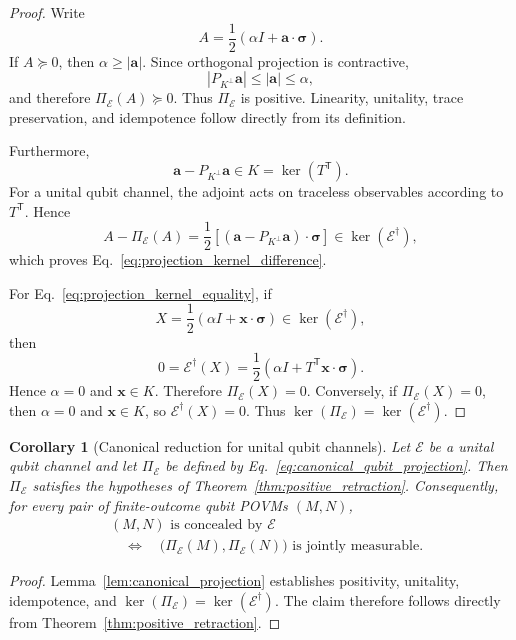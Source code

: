 \documentclass[
aps,pra,twocolumn,10pt,
superscriptaddress,longbibliography,floatfix
]{revtex4-2}
\newtheorem{corollary}[theorem]{Corollary}
\begin{document}
\begin{proof}
Write
\[
A=
\frac12
\left(
\alpha I+\mathbf a\cdot\boldsymbol\sigma
\right).
\]
If $A\succeq0$, then $\alpha\ge|\mathbf a|$. Since orthogonal projection is contractive,
\[
|P_{K^\perp}\mathbf a|
\le|\mathbf a|
\le\alpha,
\]
and therefore $\Pi_{\mathcal E}(A)\succeq0$. Thus $\Pi_{\mathcal E}$ is positive. Linearity, unitality, trace preservation, and idempotence follow directly from its definition.

Furthermore,
\[
\mathbf a-P_{K^\perp}\mathbf a\in K
=
\ker(T^{\mathsf T}).
\]
For a unital qubit channel, the adjoint acts on traceless observables according to $T^{\mathsf T}$. Hence
\[
A-\Pi_{\mathcal E}(A)
=
\frac12
\left[
(\mathbf a-P_{K^\perp}\mathbf a)
\cdot\boldsymbol\sigma
\right]
\in\ker(\mathcal E^\dagger),
\]
which proves Eq.~\eqref{eq:projection_kernel_difference}.

For Eq.~\eqref{eq:projection_kernel_equality}, if
\[
X=\frac12(\alpha I+\mathbf x\cdot\boldsymbol\sigma)
\in\ker(\mathcal E^\dagger),
\]
then
\[
0=\mathcal E^\dagger(X)
=
\frac12\left(
\alpha I+
T^{\mathsf T}\mathbf x\cdot\boldsymbol\sigma
\right).
\]
Hence $\alpha=0$ and $\mathbf x\in K$. Therefore $\Pi_{\mathcal E}(X)=0$. Conversely, if $\Pi_{\mathcal E}(X)=0$, then $\alpha=0$ and $\mathbf x\in K$, so $\mathcal E^\dagger(X)=0$. Thus $\ker(\Pi_{\mathcal E})=\ker(\mathcal E^\dagger)$.
\end{proof}

\begin{corollary}[Canonical reduction for unital qubit channels]
\label{cor:qubit_retraction}
Let $\mathcal E$ be a unital qubit channel and let $\Pi_{\mathcal E}$ be defined by Eq.~\eqref{eq:canonical_qubit_projection}. Then $\Pi_{\mathcal E}$ satisfies the hypotheses of Theorem~\ref{thm:positive_retraction}. Consequently, for every pair of finite-outcome qubit POVMs $(M,N)$,
\begin{equation}
\begin{aligned}
&(M,N)\text{ is concealed by }\mathcal E\\
&\quad\Longleftrightarrow\quad
\bigl(\Pi_{\mathcal E}(M),\Pi_{\mathcal E}(N)\bigr)
\text{ is jointly measurable}.
\end{aligned}
\label{eq:qubit_retraction_concealment}
\end{equation}
\end{corollary}

\begin{proof}
Lemma~\ref{lem:canonical_projection} establishes positivity, unitality, idempotence, and $\ker(\Pi_{\mathcal E})=\ker(\mathcal E^\dagger)$. The claim therefore follows directly from Theorem~\ref{thm:positive_retraction}.
\end{proof}
\end{document}
